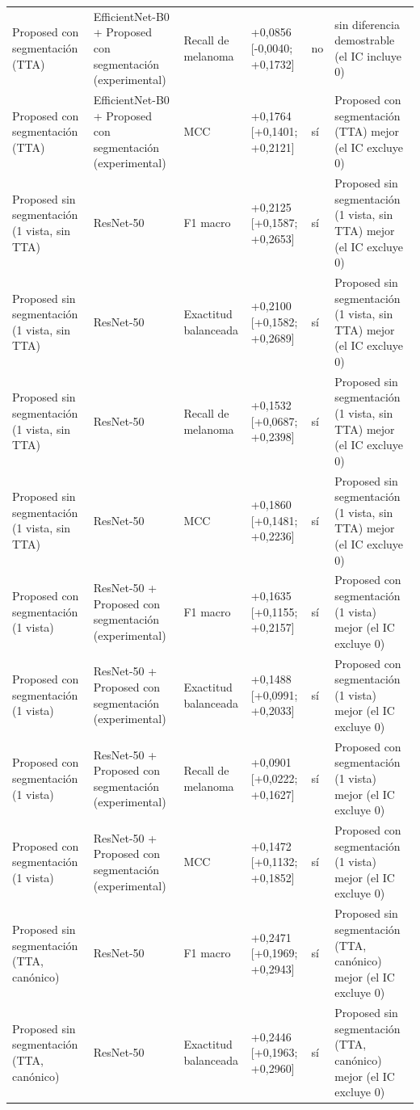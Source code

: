 \begin{longtable}{@{}llllll@{}}
Proposed con segmentación (TTA) & EfficientNet-B0 + Proposed con segmentación (experimental) & Recall de melanoma & +0,0856 [-0,0040; +0,1732] & no & sin diferencia demostrable (el IC incluye 0) \\
Proposed con segmentación (TTA) & EfficientNet-B0 + Proposed con segmentación (experimental) & MCC & +0,1764 [+0,1401; +0,2121] & sí & Proposed con segmentación (TTA) mejor (el IC excluye 0) \\
Proposed sin segmentación (1 vista, sin TTA) & ResNet-50 & F1 macro & +0,2125 [+0,1587; +0,2653] & sí & Proposed sin segmentación (1 vista, sin TTA) mejor (el IC excluye 0) \\
Proposed sin segmentación (1 vista, sin TTA) & ResNet-50 & Exactitud balanceada & +0,2100 [+0,1582; +0,2689] & sí & Proposed sin segmentación (1 vista, sin TTA) mejor (el IC excluye 0) \\
Proposed sin segmentación (1 vista, sin TTA) & ResNet-50 & Recall de melanoma & +0,1532 [+0,0687; +0,2398] & sí & Proposed sin segmentación (1 vista, sin TTA) mejor (el IC excluye 0) \\
Proposed sin segmentación (1 vista, sin TTA) & ResNet-50 & MCC & +0,1860 [+0,1481; +0,2236] & sí & Proposed sin segmentación (1 vista, sin TTA) mejor (el IC excluye 0) \\
Proposed con segmentación (1 vista) & ResNet-50 + Proposed con segmentación (experimental) & F1 macro & +0,1635 [+0,1155; +0,2157] & sí & Proposed con segmentación (1 vista) mejor (el IC excluye 0) \\
Proposed con segmentación (1 vista) & ResNet-50 + Proposed con segmentación (experimental) & Exactitud balanceada & +0,1488 [+0,0991; +0,2033] & sí & Proposed con segmentación (1 vista) mejor (el IC excluye 0) \\
Proposed con segmentación (1 vista) & ResNet-50 + Proposed con segmentación (experimental) & Recall de melanoma & +0,0901 [+0,0222; +0,1627] & sí & Proposed con segmentación (1 vista) mejor (el IC excluye 0) \\
Proposed con segmentación (1 vista) & ResNet-50 + Proposed con segmentación (experimental) & MCC & +0,1472 [+0,1132; +0,1852] & sí & Proposed con segmentación (1 vista) mejor (el IC excluye 0) \\
Proposed sin segmentación (TTA, canónico) & ResNet-50 & F1 macro & +0,2471 [+0,1969; +0,2943] & sí & Proposed sin segmentación (TTA, canónico) mejor (el IC excluye 0) \\
Proposed sin segmentación (TTA, canónico) & ResNet-50 & Exactitud balanceada & +0,2446 [+0,1963; +0,2960] & sí & Proposed sin segmentación (TTA, canónico) mejor (el IC excluye 0) \\

\end{longtable}
